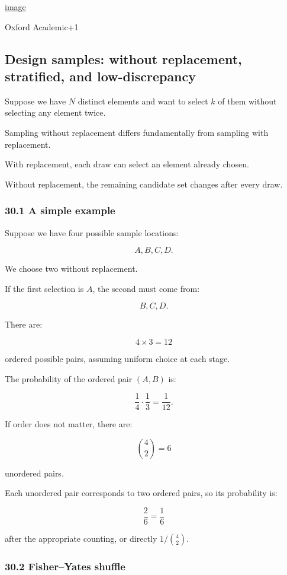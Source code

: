 \href{https://www.google.com/s2/favicons?domain=https://academic.oup.com&sz=32}{image}

Oxford Academic+1

\subsection{Design samples: without replacement, stratified, and low-discrepancy}\label{design-samples-without-replacement-stratified-and-low-discrepancy}

Suppose we have \(N\) distinct elements and want to select \(k\) of them without selecting any element twice.

Sampling without replacement differs fundamentally from sampling with replacement.

With replacement, each draw can select an element already chosen.

Without replacement, the remaining candidate set changes after every draw.

\subsubsection{30.1 A simple example}\label{a-simple-example}

Suppose we have four possible sample locations:

\[ A,B,C,D. \]

We choose two without replacement.

If the first selection is \(A\), the second must come from:

\[ B,C,D. \]

There are:

\[ 4\times3=12 \]

ordered possible pairs, assuming uniform choice at each stage.

The probability of the ordered pair \((A,B)\) is:

\[ \frac14\cdot\frac13=\frac1{12}. \]

If order does not matter, there are:

\[ \binom42=6 \]

unordered pairs.

Each unordered pair corresponds to two ordered pairs, so its probability is:

\[ \frac26=\frac16 \]

after the appropriate counting, or directly \(1/\binom42\).

\subsubsection{30.2 Fisher--Yates shuffle}\label{fisheryates-shuffle}

